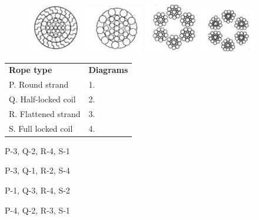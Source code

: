 \documentclass[journal,12pt,onecolumn]{IEEEtran}
\theoremstyle{remark}
\begin{document}
\begin{enumerate}
\begin{figure}[H]
\centering
\caption*{}
\label{fig:q7}
\includegraphics[width=0.2\columnwidth]{figs/2020mn7a.jpeg}
\includegraphics[width=0.2\columnwidth]{figs/2020mn7b.jpeg}
\includegraphics[width=0.2\columnwidth]{figs/2020mn7c.jpeg}
\includegraphics[width=0.2\columnwidth]{figs/2020mn7d.jpeg}
\end{figure}
\begin{center}
\begin{tabular}{ll}
\textbf{Rope type} & \textbf{Diagrams} \\
P. Round strand & 1. \\
Q. Half-locked coil & 2. \\
R. Flattened strand & 3. \\
S. Full locked coil & 4. \\
\end{tabular}
\end{center}

\hfill{}

\begin{enumerate}
\begin{multicols}{2}
\item P-3, Q-2, R-4, S-1
\item P-3, Q-1, R-2, S-4
\item P-1, Q-3, R-4, S-2
\item P-4, Q-2, R-3, S-1
\end{multicols}
\end{enumerate}


\end{enumerate}
\end{document}
